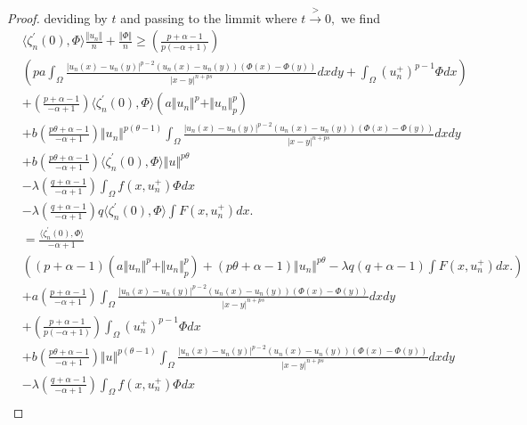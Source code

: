 \documentclass[10pt,a4paper]{amsart}
\begin{document}
\begin{proof}
deviding by $ t$ and passing to the limmit where $ t \xrightarrow{>} 0,$ we find
{\scriptsize
\begin{equation}
\begin{aligned}
& \langle\zeta^{\prime}_n(0),\Phi \rangle\frac{\Vert u_n\Vert}{n} +\frac{\Vert \Phi\Vert}{n} \geq \left(\frac{p +\alpha -1}{p(-\alpha +1)}\right)\\
&\left(p a\int_{\Omega}\frac{\vert u_n(x) -u_n(y)\vert^{p-2}(u_n(x) -u_n(y))(\Phi(x) -\Phi(y))}{\vert x -y\vert^{n  +ps}}dxdy +\int_{\Omega}(u_n^+)^{p -1}\Phi dx\right)\\
& +\left(\frac{p +\alpha -1}{-\alpha +1}\right)\langle \zeta^{\prime}_n(0),\Phi \rangle\left( a\Vert u_n\Vert^{p} +\Vert u_n\Vert^{p}_{p}\right)\\
& +b\left( \frac{p\theta +\alpha -1}{-\alpha +1}\right)\Vert u_n\Vert^{p(\theta -1)}\int_{\Omega}\frac{\vert u_n(x) -u_n(y)\vert^{p-2}( u_n(x) -u_n(y))(\Phi(x) -\Phi(y))}{\vert x -y\vert^{n  +ps}}dxdy\\
&+b\left( \frac{p\theta +\alpha -1}{-\alpha +1}\right)\langle \zeta^{\prime}_n(0),\Phi \rangle\Vert u\Vert^{p\theta }\\
& -\lambda\left(  \frac{q +\alpha -1}{-\alpha +1}\right)\int_{\Omega} f(x,u_n^+)\Phi dx\\
& -\lambda\left(  \frac{q +\alpha -1}{-\alpha +1}\right) q \langle \zeta^{\prime}_n(0),\Phi \rangle\int F(x,u_n^+)dx. \\
& =\frac{\langle \zeta^{\prime}_n(0),\Phi \rangle}{-\alpha +1}\\
&\left( (p +\alpha -1)\left( a\Vert u_n\Vert^{p} +\Vert u_n\Vert^{p}_{p}\right) +(p\theta +\alpha -1)\Vert u_n\Vert^{p\theta} -\lambda q(q +\alpha -1)\int F(x,u_n^+)dx.\right)\\
& +a\left(\frac{p +\alpha -1}{-\alpha +1}\right)\int_{\Omega}\frac{\vert u_n(x) -u_n(y)\vert^{p-2}(u_n(x) -u_n(y))(\Phi(x) -\Phi(y))}{\vert x -y\vert^{n  +ps}}dxdy
\\
& +\left(\frac{p +\alpha -1}{p(-\alpha +1)}\right)\int_{\Omega}(u_n^+)^{p -1}\Phi dx\\
& +b\left( \frac{p\theta +\alpha -1}{-\alpha +1}\right)\Vert u\Vert^{p(\theta -1)}\int_{\Omega}\frac{\vert u_n(x) -u_n(y)\vert^{p-2}(u_n(x) -u_n(y))(\Phi(x) -\Phi(y))}{\vert x -y\vert^{n  +ps}}dxdy\\
& -\lambda\left(  \frac{q +\alpha -1}{-\alpha +1}\right)\int_{\Omega} f(x,u_n^+)\Phi dx\\
\end{aligned}
\end{equation}
}
\end{proof}
\end{document}
